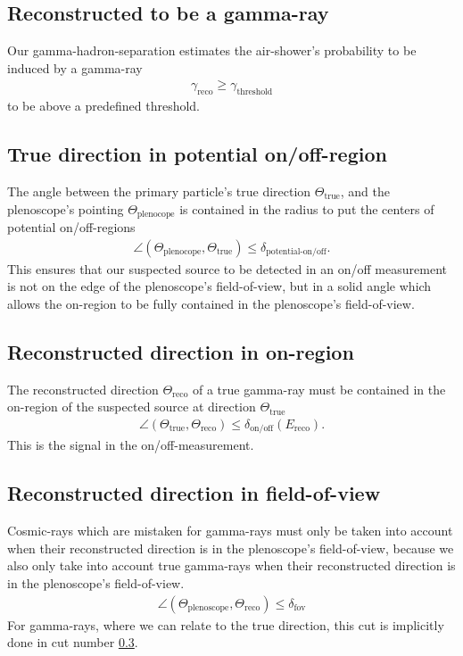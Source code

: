 \documentclass[a4paper,12pt,oneside]{article}
\begin{document}
\subsection{Reconstructed to be a gamma-ray}
\label{SecReconstructedToBeAGammaRay}
%
Our gamma-hadron-separation estimates the air-shower's probability to be induced by a gamma-ray
%
\begin{eqnarray*}
\gamma_\text{reco} \geq \gamma_\text{threshold}
\end{eqnarray*}
%
to be above a predefined threshold.
%
\subsection{True direction in potential on/off-region}
\label{SecTrueDirectionInPotentialOnOffRegion}
%
The angle between the primary particle's true direction $\Theta_\text{true}$, and the plenoscope's pointing $\Theta_\text{plenocope}$ is contained in the radius to put the centers of potential on/off-regions
%
\begin{eqnarray*}
\angle(\Theta_\text{plenocope},\Theta_\text{true}) \leq \delta_\text{potential-on/off}.
\end{eqnarray*}
%
This ensures that our suspected source to be detected in an on/off measurement is not on the edge of the plenoscope's field-of-view, but in a solid angle which allows the on-region to be fully contained in the plenoscope's field-of-view.
%
\subsection{Reconstructed direction in on-region}
\label{SecReconstructedDirectionInOnRegion}
%
The reconstructed direction $\Theta_\text{reco}$ of a true gamma-ray must be contained in the on-region of the suspected source at direction $\Theta_\text{true}$
%
\begin{eqnarray*}
\angle(\Theta_\text{true},\Theta_\text{reco}) \leq \delta_\text{on/off}(E_\text{reco}).
\end{eqnarray*}
%
This is the signal in the on/off-measurement.
%
\subsection{Reconstructed direction in field-of-view}
\label{SecReconstructedDirectionInFieldOfView}
%
Cosmic-rays which are mistaken for gamma-rays must only be taken into account when their reconstructed direction is in the plenoscope's field-of-view, because we also only take into account true gamma-rays when their reconstructed direction is in the plenoscope's field-of-view.
%
\begin{eqnarray*}
\angle(\Theta_\text{plenoscope},\Theta_\text{reco}) \leq \delta_\text{fov}
\end{eqnarray*}
%
For gamma-rays, where we can relate to the true direction, this cut is implicitly done in cut number \ref{SecReconstructedDirectionInOnRegion}.
%
\end{document}
